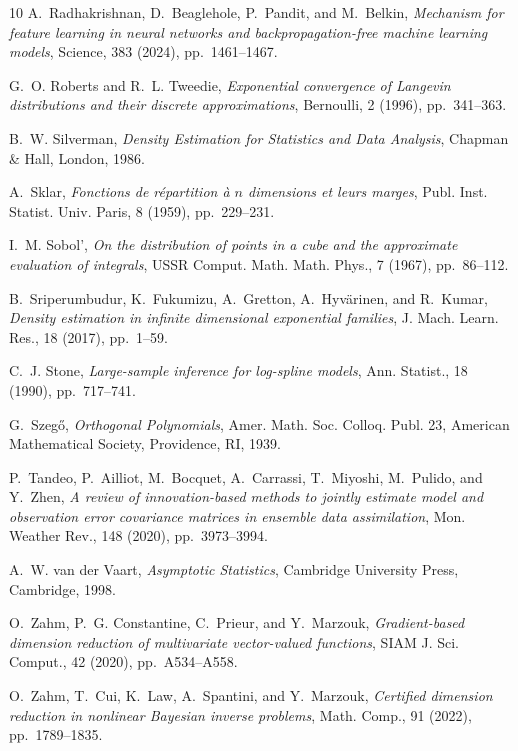 \begin{thebibliography}{10}
{\sc A.~Radhakrishnan, D.~Beaglehole, P.~Pandit, and M.~Belkin}, {\em Mechanism for feature learning in neural networks and backpropagation-free machine learning models}, Science, 383 (2024), pp.~1461--1467.

{\sc G.~O. Roberts and R.~L. Tweedie}, {\em Exponential convergence of {L}angevin distributions and their discrete approximations}, Bernoulli, 2 (1996), pp.~341--363.

{\sc B.~W. Silverman}, {\em Density Estimation for Statistics and Data Analysis}, Chapman \& Hall, London, 1986.

{\sc A.~Sklar}, {\em Fonctions de r\'epartition \`a $n$ dimensions et leurs marges}, Publ. Inst. Statist. Univ. Paris, 8 (1959), pp.~229--231.

{\sc I.~M. Sobol'}, {\em On the distribution of points in a cube and the approximate evaluation of integrals}, USSR Comput. Math. Math. Phys., 7 (1967), pp.~86--112.

{\sc B.~Sriperumbudur, K.~Fukumizu, A.~Gretton, A.~Hyv\"arinen, and R.~Kumar}, {\em Density estimation in infinite dimensional exponential families}, J. Mach. Learn. Res., 18 (2017), pp.~1--59.

{\sc C.~J. Stone}, {\em Large-sample inference for log-spline models}, Ann. Statist., 18 (1990), pp.~717--741.

{\sc G.~Szeg\H{o}}, {\em Orthogonal Polynomials}, Amer. Math. Soc. Colloq. Publ. 23, American Mathematical Society, Providence, RI, 1939.

{\sc P.~Tandeo, P.~Ailliot, M.~Bocquet, A.~Carrassi, T.~Miyoshi, M.~Pulido, and Y.~Zhen}, {\em A review of innovation-based methods to jointly estimate model and observation error covariance matrices in ensemble data assimilation}, Mon. Weather Rev., 148 (2020), pp.~3973--3994.

{\sc A.~W. van der Vaart}, {\em Asymptotic Statistics}, Cambridge University Press, Cambridge, 1998.

{\sc O.~Zahm, P.~G. Constantine, C.~Prieur, and Y.~Marzouk}, {\em Gradient-based dimension reduction of multivariate vector-valued functions}, SIAM J. Sci. Comput., 42 (2020), pp.~A534--A558.

{\sc O.~Zahm, T.~Cui, K.~Law, A.~Spantini, and Y.~Marzouk}, {\em Certified dimension reduction in nonlinear {B}ayesian inverse problems}, Math. Comp., 91 (2022), pp.~1789--1835.

\end{thebibliography}
